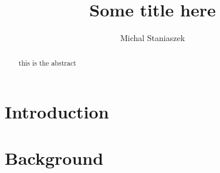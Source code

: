 \documentclass[10pt,a4paper]{report}
\author{Michal Staniaszek}
\title{Some title here}
\begin{document}
\maketitle
\begin{abstract}
  this is the abstract
\end{abstract}
\tableofcontents
\chapter{Introduction}
\chapter{Background}
\nocite{*}
\printbibliography
\end{document}

